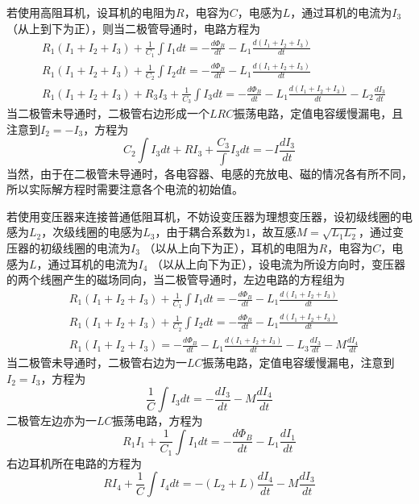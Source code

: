 \documentclass[10pt,a4paper]{article}
\theoremstyle{remark}
\begin{document}
若使用高阻耳机，设耳机的电阻为$R$，电容为$C$，电感为$L$，通过耳机的电流为$I_3$（从上到下为正），则当二极管导通时，电路方程为
\[
\begin{split}
&R_1(I_1 + I_2 + I_3) + \frac{1}{C_1}\int I_1dt = - \frac{d\Phi_B}{dt} - L_1\frac{d(I_1 + I_2 + I_3)}{dt}\\
&R_1(I_1 + I_2 + I_3) + \frac{1}{C_2}\int I_2dt = - \frac{d\Phi_B}{dt} - L_1\frac{d(I_1 + I_2 + I_3)}{dt}\\
&R_1(I_1 + I_2 + I_3) + R_3I_3 + \frac{1}{C_3}\int I_3dt = - \frac{d\Phi_B}{dt} - L_1\frac{d(I_1 + I_2 + I_3)}{dt} - L_2\frac{dI_3}{dt}
\end{split}
\]
当二极管未导通时，二极管右边形成一个$LRC$振荡电路，定值电容缓慢漏电，且注意到$I_2 = - I_3$，方程为
\[
C_2\int I_3dt + RI_3 + \frac{C_3}\int I_3dt = - I\frac{dI_3}{dt}
\]
当然，由于在二极管未导通时，各电容器、电感的充放电、磁的情况各有所不同，所以实际解方程时需要注意各个电流的初始值。

若使用变压器来连接普通低阻耳机，不妨设变压器为理想变压器，设初级线圈的电感为$L_2$，次级线圈的电感为$L_3$，由于耦合系数为$1$，故互感$M = \sqrt{L_1L_2}$，通过变压器的初级线圈的电流为$I_3$ （以从上向下为正），耳机的电阻为$R$，电容为$C$，电感为$L$，通过耳机的电流为$I_4$ （以从上向下为正），设电流为所设方向时，变压器的两个线圈产生的磁场同向，当二极管导通时，左边电路的方程组为
\[
\begin{split}
&R_1(I_1 + I_2 + I_3) + \frac{1}{C_1}\int I_1dt = - \frac{d\Phi_B}{dt} - L_1\frac{d(I_1 + I_2 + I_3)}{dt}\\
&R_1(I_1 + I_2 + I_3) + \frac{1}{C_2}\int I_2dt = - \frac{d\Phi_B}{dt} - L_1\frac{d(I_1 + I_2 + I_3)}{dt}\\
&R_1(I_1 + I_2 + I_3) = - \frac{d\Phi_B}{dt} - L_1\frac{d(I_1 + I_2 + I_3)}{dt} - L_3\frac{dI_3}{dt} - M\frac{dI_4}{dt}
\end{split}
\]
当二极管未导通时，二极管右边为一$LC$振荡电路，定值电容缓慢漏电，注意到$I_2 = I_3$，方程为
\[
\frac{1}{C}\int I_3dt = - \frac{dI_3}{dt} - M\frac{dI_4}{dt}
\]
二极管左边亦为一$LC$振荡电路，方程为
\[
R_1I_1 + \frac{1}{C_1}\int I_1dt = - \frac{d\Phi_B}{dt} - L_1\frac{dI_1}{dt}
\]
右边耳机所在电路的方程为
\[
RI_4 +  \frac{1}{C}\int I_4dt = - (L_2 + L)\frac{dI_4}{dt} - M\frac{dI_3}{dt}
\]
\end{document}
